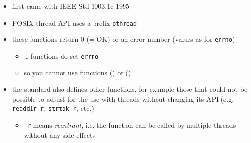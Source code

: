 \begin{slide}

\begin{itemize}
\item first came with IEEE Std 1003.1c-1995
\item POSIX thread API uses a prefix \texttt{pthread\_}
\item these functions return 0 (= OK) or an error number (values as for
\texttt{errno})
\begin{itemize}
\item \dots{} functions do  set \texttt{errno}
\item so you cannot use functions () or ()
\end{itemize}
\item the standard also defines other functions, for example those that could
not be possible to adjust for the use with threads without changing its API (e.g.
\texttt{readdir\_r}, \texttt{strtok\_r}, etc.)
\begin{itemize}
\item \texttt{\_r} means \emph{reentrant}, i.e. the function can be called by
multiple threads without any side effects
\end{itemize}
\end{itemize}

\end{slide}

\label{POSIXTHREADS}

